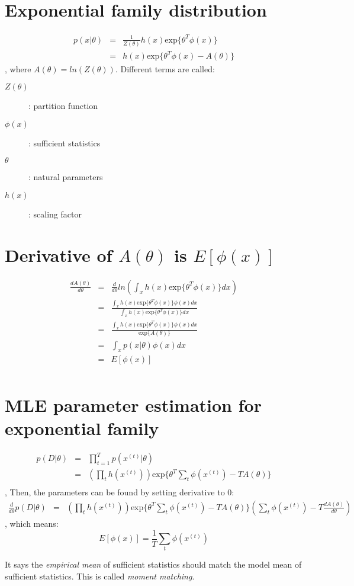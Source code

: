 \documentclass[11pts]{article}
\begin{document}
\section{Exponential family distribution}
\begin{eqnarray*}
p(x|\theta) & = & \frac{1}{Z(\theta)} h(x) \mathrm{exp}\{\theta^T \phi(x)\} \\
& = & h(x)\mathrm{exp}\{\theta^T \phi(x) - A(\theta)\}
\end{eqnarray*}
, where $A(\theta) = ln(Z(\theta))$. Different terms are called:

\begin{description}
\item[$Z(\theta)$]: partition function
\item[$\phi(x)$]: sufficient statistics
\item[$\theta$]: natural parameters
\item[$h(x)$]: scaling factor
\end{description}

\section{Derivative of $A(\theta)$ is $E[\phi(x)]$}
\begin{eqnarray*}
\frac{dA(\theta)}{d\theta} & = & \frac{d}{d\theta}ln(\int_x h(x)\mathrm{exp}\{\theta^T \phi(x)\}dx)\\
& = & \frac{\int_x h(x)\mathrm{exp}\{\theta^T\phi(x)\}\phi(x)dx}{\int_x h(x)\mathrm{exp}\{\theta^T\phi(x)\}dx} \\
& = & \frac{\int_x h(x)\mathrm{exp}\{\theta^T\phi(x)\}\phi(x)dx}{\mathrm{exp}\{A(\theta)\}} \\
& = & \int_x p(x|\theta)\phi(x)dx \\
& = & E[\phi(x)] \\ 
\end{eqnarray*}

\section{MLE parameter estimation for exponential family}
\begin{eqnarray*}
p(D|\theta) & = & \prod_{t=1}^T p(x^{(t)}|\theta) \\
& = & (\prod_t h(x^{(t)})) \mathrm{exp}\{\theta^T \sum_t \phi(x^{(t)}) - TA(\theta)\} \\
\end{eqnarray*}
, Then, the parameters can be found by setting derivative to $0$:
\begin{eqnarray*}
\frac{d}{d\theta} p(D|\theta) & = & (\prod_t h(x^{(t)}))\mathrm{exp}\{\theta^T \sum_t\phi(x^{(t)}) - TA(\theta)\}(\sum_t \phi(x^{(t)}) - T\frac{dA(\theta)}{d\theta})
\end{eqnarray*}
, which means:
\[
E[\phi(x)] = \frac{1}{T}\sum_t \phi(x^{(t)})
\]

It says the \emph{empirical mean} of sufficient statistics should match the model mean of sufficient statistics. This is called \emph{moment matching}.
\end{document}
